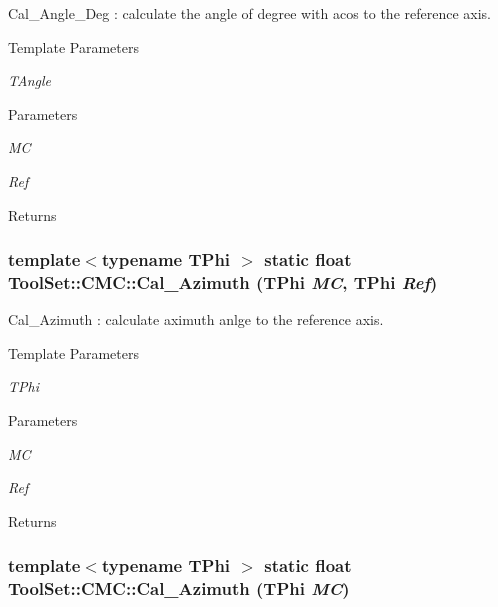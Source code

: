 Cal\_\-Angle\_\-Deg : calculate the angle of degree with acos to the reference axis. 
\begin{DoxyTemplParams}{Template Parameters}
\item[{\em TAngle}]\end{DoxyTemplParams}

\begin{DoxyParams}{Parameters}
\item[{\em MC}]\item[{\em Ref}]\end{DoxyParams}
\begin{DoxyReturn}{Returns}

\end{DoxyReturn}
\hypertarget{classToolSet_1_1CMC_ab77fa5dd46a12ac8887776724261f72b}{
\subsubsection[{Cal\_\-Azimuth}]{\setlength{\rightskip}{0pt plus 5cm}template$<$typename TPhi $>$ static float ToolSet::CMC::Cal\_\-Azimuth (TPhi {\em MC}, \/  TPhi {\em Ref})}}
\label{classToolSet_1_1CMC_ab77fa5dd46a12ac8887776724261f72b}


Cal\_\-Azimuth : calculate aximuth anlge to the reference axis. 
\begin{DoxyTemplParams}{Template Parameters}
\item[{\em TPhi}]\end{DoxyTemplParams}

\begin{DoxyParams}{Parameters}
\item[{\em MC}]\item[{\em Ref}]\end{DoxyParams}
\begin{DoxyReturn}{Returns}

\end{DoxyReturn}
\hypertarget{classToolSet_1_1CMC_a3c8cfd47eac44d6e39a38598bb9158f1}{
\subsubsection[{Cal\_\-Azimuth}]{\setlength{\rightskip}{0pt plus 5cm}template$<$typename TPhi $>$ static float ToolSet::CMC::Cal\_\-Azimuth (TPhi {\em MC})}}
\label{classToolSet_1_1CMC_a3c8cfd47eac44d6e39a38598bb9158f1}


